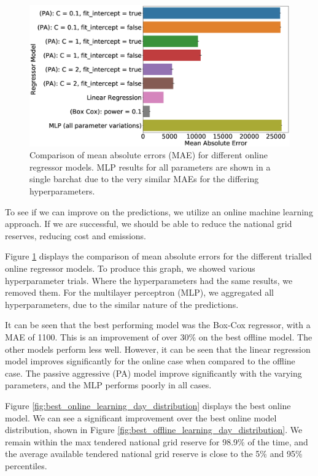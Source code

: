 \documentclass[final,3p,times,twocolumn,numbers]{elsarticle}
\begin{document}
\begin{figure}
\includegraphics[width=\columnwidth,natwidth=1300,natheight=1300]{figures/results/online_model_mae_barplot.eps}
\caption{Comparison of mean absolute errors (MAE) for different online regressor models. MLP results for all parameters are shown in a single barchat due to the very similar MAEs for the differing hyperparameters.}
\label{fig:online_model_mae_barplot}
\end{figure}


To see if we can improve on the predictions, we utilize an online machine learning approach. If we are successful, we should be able to reduce the national grid reserves, reducing cost and emissions.


Figure \ref{fig:online_model_mae_barplot} displays the comparison of mean absolute errors for the different trialled online regressor models. To produce this graph, we showed various hyperparameter trials. Where the hyperparameters had the same results, we removed them. For the multilayer perceptron (MLP), we aggregated all hyperparameters, due to the similar nature of the predictions.

It can be seen that the best performing model was the Box-Cox regressor, with a MAE of 1100. This is an improvement of over 30\% on the best offline model. The other models perform less well. However, it can be seen that the linear regression model improves significantly for the online case when compared to the offline case. The passive aggressive (PA) model improve significantly with the varying parameters, and the MLP performs poorly in all cases.



Figure \ref{fig:best_online_learning_day_distribution} displays the best online model. We can see a significant improvement over the best online model distribution, shown in Figure \ref{fig:best_offline_learning_day_distribution}. We remain within the max tendered national grid reserve for 98.9\% of the time, and the average available tendered national grid reserve is close to the 5\% and 95\% percentiles.
\end{document}
